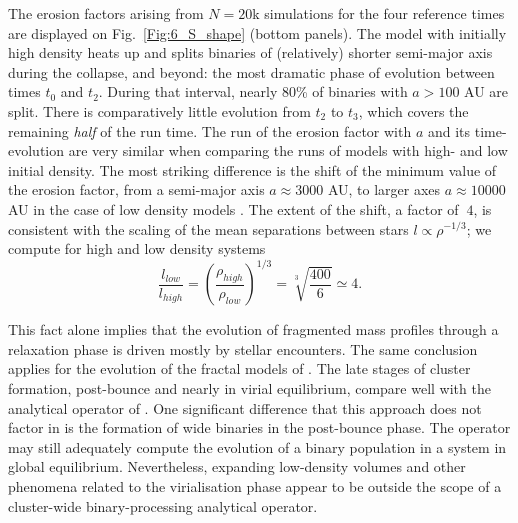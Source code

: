  The erosion factors arising from $N = 20$k simulations for the four reference times are displayed on  Fig.~\ref{Fig:6_S_shape} (bottom panels). 
%
The model with initially high density heats up and splits binaries of  (relatively) shorter semi-major axis  during the collapse, and beyond: the most dramatic phase of evolution between times  $t_0$ and $t_2$. During that interval,  nearly 80\% of  binaries with $a > 100 $ AU are split. There is comparatively little evolution from $t_2$ to $t_3$,  which covers the remaining {\it half} of the run time.  
The run of the erosion factor with $a$  and its time-evolution are very similar  when comparing the runs of models with  high- and low initial  density. The most striking difference is the shift of the minimum value of the erosion factor, from a semi-major axis $a \approx 3 000$ AU, to larger axes $a \approx 10 000$ AU  in the case of low density models .  The extent of the shift, a factor of $~4$, is consistent with the scaling of the mean separations between stars $ l \propto \rho^{-1/3}$; we compute for high and low density systems 
\begin{equation}
\frac{l_{low}}{l_{high}} = \left(  \frac{\rho_{high}}{\rho_{low}}\right)^{1/3} = \sqrt[3]{\frac{400}{6}} \simeq 4 .
\end{equation}

This fact alone implies that the evolution of fragmented mass profiles through a relaxation phase is driven mostly by stellar encounters. The same conclusion applies for the evolution of the  fractal models of \cite{Parker2011}. 
The late stages of cluster formation, post-bounce and nearly in virial equilibrium, compare well with the 
analytical operator  of \cite{Marks2012}. One significant difference that this approach does not factor in is the formation of wide binaries in the post-bounce phase. The operator may still adequately compute  the evolution of a binary population in a system in global  equilibrium. Nevertheless, expanding low-density volumes and other phenomena related to the virialisation phase appear to be outside the scope of a cluster-wide binary-processing analytical  operator. 

